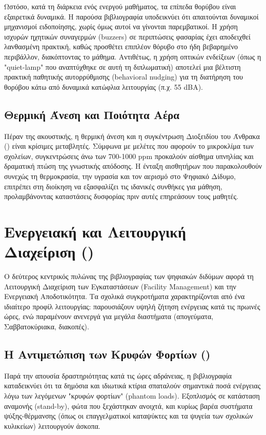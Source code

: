 Ωστόσο, κατά τη διάρκεια ενός ενεργού μαθήματος, τα επίπεδα θορύβου είναι εξαιρετικά δυναμικά. Η παρούσα βιβλιογραφία υποδεικνύει ότι απαιτούνται δυναμικοί μηχανισμοί ειδοποίησης, χωρίς όμως αυτοί να γίνονται παρεμβατικοί. Η χρήση ισχυρών ηχητικών συναγερμών (buzzers) σε περιπτώσεις φασαρίας έχει αποδειχθεί λανθασμένη πρακτική, καθώς προσθέτει επιπλέον θόρυβο στο ήδη βεβαρημένο περιβάλλον, διακόπτοντας το μάθημα. Αντιθέτως, η χρήση οπτικών ενδείξεων (όπως η "quiet-lamp" που αναπτύχθηκε σε αυτή τη διπλωματική) αποτελεί μια βέλτιστη πρακτική παθητικής αυτορρύθμισης (behavioral nudging) για τη διατήρηση του θορύβου κάτω από δυναμικά κατώφλια λειτουργίας (π.χ. 55 dBA).

\subsection{Θερμική Άνεση και Ποιότητα Αέρα}
Πέραν της ακουστικής, η θερμική άνεση και η συγκέντρωση Διοξειδίου του Άνθρακα () είναι κρίσιμες μεταβλητές. Σύμφωνα με μελέτες που αφορούν το μικροκλίμα των σχολείων, συγκεντρώσεις  άνω των 700-1000 ppm προκαλούν αίσθημα υπνηλίας και δραματική πτώση της γνωστικής απόδοσης. Η ένταξη αισθητήρων που παρακολουθούν συνεχώς τη θερμοκρασία, την υγρασία και τον αερισμό στο Ψηφιακό Δίδυμο, επιτρέπει στη διοίκηση να εξασφαλίζει τις ιδανικές συνθήκες για μάθηση, προλαμβάνοντας καταστάσεις δυσφορίας πριν αυτές επηρεάσουν τους μαθητές.

\section{Ενεργειακή και Λειτουργική Διαχείριση ()}
Ο δεύτερος κεντρικός πυλώνας της βιβλιογραφίας των ψηφιακών διδύμων αφορά τη Λειτουργική Διαχείριση των Εγκαταστάσεων (Facility Management) και την Ενεργειακή Αποδοτικότητα. Τα σχολικά συγκροτήματα χαρακτηρίζονται από ένα ιδιαίτερο προφίλ λειτουργίας: παρουσιάζουν υψηλή ζήτηση ενέργειας κατά τις πρωινές ώρες, ενώ παραμένουν ανενεργά για μεγάλα διαστήματα (απογεύματα, Σαββατοκύριακα, διακοπές).

\subsection{Η Αντιμετώπιση των Κρυφών Φορτίων ()}
Παρά την απουσία δραστηριότητας κατά τις ώρες αδράνειας, η βιβλιογραφία καταδεικνύει ότι τα δημόσια και ιδιωτικά κτίρια σπαταλούν σημαντικά ποσά ενέργειας λόγω των λεγόμενων "κρυφών φορτίων" (phantom loads). Εξοπλισμός σε κατάσταση αναμονής (stand-by), φώτα που ξεχάστηκαν ανοιχτά, και κυρίως βαρέα συστήματα ψύξης-θέρμανσης (όπως οι επαγγελματικοί καταψύκτες και τα ψυγεία των σχολικών κυλικείων) λειτουργούν άσκοπα.

